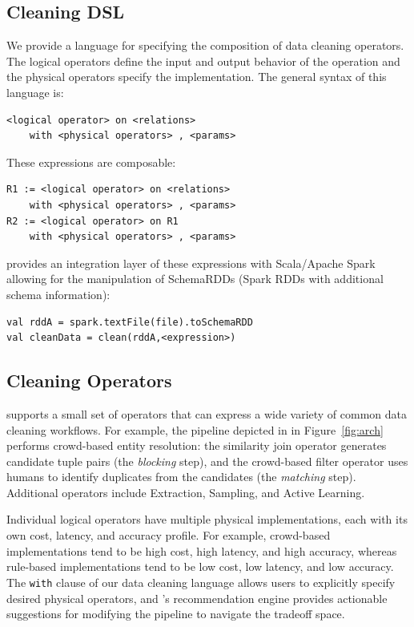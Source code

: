 \subsection{Cleaning DSL}
\label{sec:dsl}
We provide a language for specifying the composition of data cleaning operators.
The logical operators define the input and output behavior of the operation and 
the physical operators specify the implementation.
The general syntax of this language is:
\begin{lstlisting}
<logical operator> on <relations>
	with <physical operators> , <params>
\end{lstlisting}

These expressions are composable:
\begin{lstlisting}
R1 := <logical operator> on <relations> 
	with <physical operators> , <params>
R2 := <logical operator> on R1 
	with <physical operators> , <params>
\end{lstlisting}
\projx provides an integration layer of these expressions with Scala/Apache Spark allowing for the manipulation of SchemaRDDs (Spark RDDs with additional schema information):
\begin{lstlisting}
val rddA = spark.textFile(file).toSchemaRDD
val cleanData = clean(rddA,<expression>)
\end{lstlisting}

\subsection{Cleaning Operators}
\label{sec:operators}
\sys supports a small set of operators that can express a wide variety of common data cleaning workflows. For example, the pipeline depicted in in Figure~\ref{fig:arch} performs crowd-based entity resolution: the similarity join operator generates candidate tuple pairs (the \textit{blocking} step), and the crowd-based filter operator uses humans to identify duplicates from the candidates (the \textit{matching} step). Additional operators include Extraction, Sampling, and Active Learning.

Individual logical operators have multiple physical implementations, each with its own cost, latency, and accuracy profile. For example, crowd-based implementations tend to be high cost, high latency, and high accuracy, whereas rule-based implementations tend to be low cost, low latency, and low accuracy. The \texttt{with} clause of our data cleaning language allows users to explicitly specify desired physical operators, and \sys's recommendation engine provides actionable suggestions for modifying the pipeline to navigate the tradeoff space.





